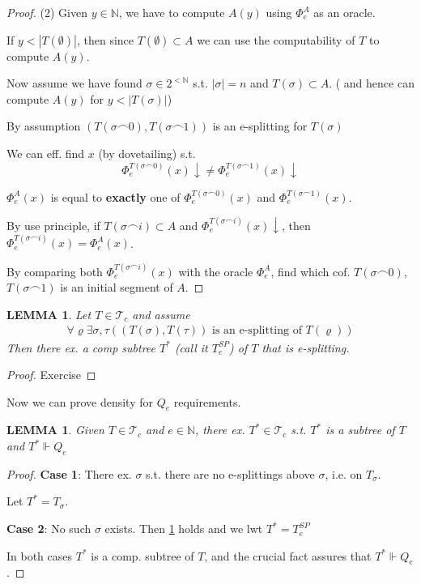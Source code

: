 \documentclass[12pt]{article}
\newcommand{\Nat}{\ensuremath{\mathbb{N}}}
\newcommand{\forces}{\Vdash}
\begin{document}
\begin{proof}
  (2) Given $y \in \Nat$, we have to compute $A(y)$ 
  using $\Phi^A_e$ as an oracle.

  If $y < |T(\emptyset)|$, then since $T(\emptyset) \subset A$
  we can use the computability of $T$ to compute $A(y)$.

  Now assume we have found $\sigma \in 2^{<\Nat}$ s.t. $|\sigma| = n$
  and $T(\sigma) \subset A$.
  ( and hence can compute $A(y)$ for $ y < |T(\sigma)|$)

  By assumption 
      $ \left(
        T(\sigma\frown 0), T(\sigma\frown 1)
        \right) 
      $
      is an e-splitting for $T(\sigma)$

      We can eff. find $x$ (by dovetailing) s.t. 
      \[
        \Phi_e^{T(\sigma\frown 0)}(x)\downarrow 
    \ne \Phi_e^{T(\sigma\frown 1)}(x)\downarrow
      \]


      $\Phi_e^A(x)$ is equal to \textbf{exactly} one of 
        $\Phi_e^{T(\sigma\frown 0)}(x)$ and
        $\Phi_e^{T(\sigma\frown 1)}(x)$.

     By use principle, if $T(\sigma \frown i) \subset A$ and 
     $\Phi_e^{T(\sigma\frown i)}(x)\downarrow$, 
     then $\Phi_e^{T(\sigma\frown i)}(x) = \Phi^A_e(x)$.

     By comparing both $\Phi_e^{T(\sigma\frown i)}(x)$ 
     with the oracle $\Phi^A_e$,
     find which cof. $T(\sigma\frown 0)$, $T(\sigma\frown 1)$
     is an initial segment of $A$.
\end{proof}

\newtheorem*{splitlem}{LEMMA}
\begin{splitlem}
  Let $T \in \mathcal{T}_c$ and assume
  \begin{align*}
    \forall \varrho \exists \sigma, \tau ( (T(\sigma), T(\tau)) \text{ is an e-splitting of $T(\varrho)$})
  \end{align*}
  \label{eq:star}
  Then there ex. a comp subtree $T^*$ (call it $T^{SP}_e$) of $T$ that 
  is e-splitting.
\end{splitlem}
\begin{proof}
  Exercise
\end{proof}

Now we can prove density for $Q_e$ requirements.

\newtheorem*{lem2}{LEMMA}
\begin{lem2}
  Given $T \in \mathcal{T}_c$ and $e \in \Nat$, 
  there ex. $T^* \in \mathcal{T}_c$ s.t.
  $T^*$ is a subtree of $T$ and $T^* \forces Q_e$
\end{lem2}
\begin{proof}
  \textbf{Case 1}: There ex. $\sigma$ s.t. there are no 
  e-splittings above $\sigma$, i.e. on $T_\sigma$.

  Let $T^* = T_\sigma$.

  \textbf{Case 2}: No such $\sigma$ exists.  Then \ref{eq:star} holds and
  we lwt $T^* = T^{SP}_e$

  In both cases $T^*$ is a comp. subtree of $T$,
  and the crucial fact assures that $T^* \forces Q_e$.
\end{proof}
\end{document}
